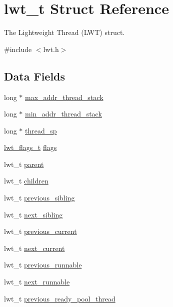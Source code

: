 \hypertarget{structlwt}{\section{lwt\+\_\+t Struct Reference}
\label{structlwt}
}


The Lightweight Thread (L\+W\+T) struct.  




{\ttfamily \#include $<$lwt.\+h$>$}

\subsection*{Data Fields}
\begin{DoxyCompactItemize}
\item 
long $\ast$ \hyperlink{structlwt_ae97cdce617ee026378588f57a999f972}{max\+\_\+addr\+\_\+thread\+\_\+stack}
\item 
long $\ast$ \hyperlink{structlwt_a62ea9a882e0a197b9b076e1e018048d7}{min\+\_\+addr\+\_\+thread\+\_\+stack}
\item 
long $\ast$ \hyperlink{structlwt_aba48cdf2f962d7ededf74923ddd33ea1}{thread\+\_\+sp}
\item 
\hyperlink{lwt_8h_a3e65a66932a8da34b1092c3a23d54c6f}{lwt\+\_\+flags\+\_\+t} \hyperlink{structlwt_a21694dc7499aff78ea8f90140b0ec60c}{flags}
\item 
lwt\+\_\+t \hyperlink{structlwt_a1849cde569fc8f254db05365de570b0e}{parent}
\item 
lwt\+\_\+t \hyperlink{structlwt_a33d2fa8a95fe7c0deb7c7723bd4af344}{children}
\item 
lwt\+\_\+t \hyperlink{structlwt_a28f05f6ebc974d92415a55b8e190670e}{previous\+\_\+sibling}
\item 
lwt\+\_\+t \hyperlink{structlwt_a5557ab4e2bdd3634b38f5035461767d6}{next\+\_\+sibling}
\item 
lwt\+\_\+t \hyperlink{structlwt_afe18cb4e9b5f4c60289674d2298993a2}{previous\+\_\+current}
\item 
lwt\+\_\+t \hyperlink{structlwt_a96a9b5218a20b704188442a3056601ae}{next\+\_\+current}
\item 
lwt\+\_\+t \hyperlink{structlwt_acb89e009a8cb87cbd5d71ab5ca08911b}{previous\+\_\+runnable}
\item 
lwt\+\_\+t \hyperlink{structlwt_a1636aae4155df6a60c90c7ab737687e4}{next\+\_\+runnable}
\item 
lwt\+\_\+t \hyperlink{structlwt_a86cf2d2c1b778c2649f12626dbe8ea49}{previous\+\_\+ready\+\_\+pool\+\_\+thread}

\end{DoxyCompactItemize}
